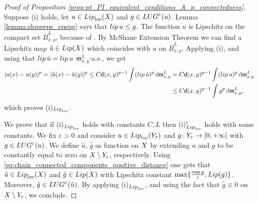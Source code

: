 \documentclass[12pt]{amsart}
\newcommand{\sfd}{{\sf d}}
\renewcommand{\d}{{\mathrm d}}
\newcommand{\X}{{\rm X}}
\newcommand{\Y}{{\rm Y}}
\newcommand{\lip}{{\rm lip}}
\newcommand{\Lip}{{\rm Lip}}
\newcommand{\loc}{{\rm loc}}
\newcommand{\mm}{\mathfrak m}
\theoremstyle{definition}
\newcommand{\LUG}[1]{{\rm LUG}^{#1}}
\begin{document}
\begin{proof}[Proof of Proposition \ref{prop:pt_PI_equivalent_conditions_A_p_connectedness}]
    Suppose (i) holds, let $u \in \Lip_\loc(\X)$ and $g\in \LUG{\varepsilon}(u)$. Lemma \ref{lemma:slopeeps_epsug} says that $\lip\,u \le g$. The function $u$ is Lipschitz on the compact set $\overline{B}_{x,y}^L$, because of \cite[Theorem 4.2]{BeerGarrido2015}. By McShane Extension Theorem we can find a Lipschitz map $\hat{u} \in \Lip(\X)$ which coincides with $u$ on $\overline{B}_{x,y}^L$. Applying (i), and using that $\lip\,\hat{u} = \lip\,u$ $\mm_{x,y}^L$-a.e., we get
    \begin{equation}
        \begin{aligned}
            \vert u(x) - u(y) \vert^p = \vert \hat{u}(x) - \hat{u}(y) \vert^p \le C\sfd(x,y)^{p-1}\int (\lip\,\hat{u})^p\,\d\mm_{x,y}^L &= C\sfd(x,y)^{p-1}\int (\lip\,{u})^p\,\d\mm_{x,y}^L \\&\le C\sfd(x,y)^{p-1}\int g^p\,\d\mm_{x,y}^L,
        \end{aligned}
    \end{equation}
    which proves (i)$_{\Lip_\loc}$.

    We prove that if (i)$_{\Lip_\loc}$ holds with constants $C,L$ then (i)$'_{\Lip_\loc}$ holds with same constants. We fix $\varepsilon>0$ and consider 
    $u\in \Lip_\loc(\Y_\varepsilon)$ and $g \colon \Y_\varepsilon \to [0,+\infty]$ with $g\in \LUG{\varepsilon}(u)$. We define $\hat{u}$, $\hat{g}$ as function on $\X$ by extending $u$ and $g$ to be constantly equal to zero on $\X \setminus \Y_\varepsilon$, respectively. Using \eqref{eq:chain_connected_components_positive_distance} one gets that $\hat{u} \in \Lip_\loc(\X)$ and $\hat{g} \in \Lip(\X)$ with Lipschitz constant $\max\{ \frac{\sup g}{\varepsilon}, {\rm Lip}(g)\}$. Moreover, $\hat{g} \in \LUG{\varepsilon}(\hat{u})$. By applying (i)$_{\Lip_\loc}$, and using the fact that $\hat{g} \equiv 0$ on $\X \setminus \Y_\varepsilon$, we conclude.


\end{proof}
\end{document}

